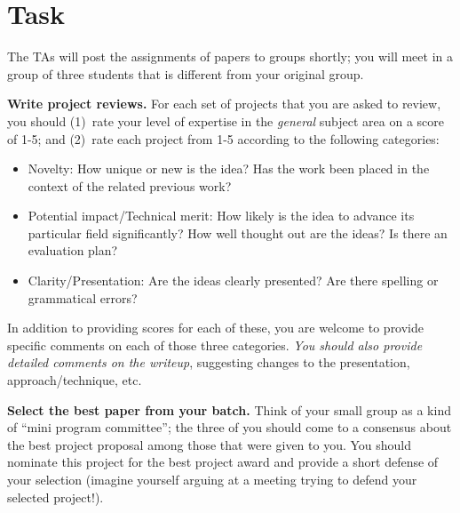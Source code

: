 \documentclass[11pt]{article}
\begin{document}
\section{Task}


The TAs will post the assignments of papers to groups shortly; you will
meet in a group of three students that is different from your original
group.  

{\bf Write project reviews.}
For each set of projects that you are asked to review, you
should (1)~rate your level of expertise in the {\em general} subject
area on a score of 1-5; and (2)~rate each project from 1-5 according to
the following categories:

\begin{itemize}
\itemsep=-1pt
\item Novelty: How unique or new is the idea?  Has the work been placed
  in the context of the related previous work?
\item Potential impact/Technical merit: How likely is the idea to
  advance its particular field significantly?  How well thought out are
  the ideas?  Is there an evaluation plan?
\item Clarity/Presentation: Are the ideas clearly presented?  Are there
  spelling or grammatical errors?
\end{itemize}

In addition to providing scores for each of these, you are welcome to
provide specific comments on each of those three categories.  {\em You
  should also provide detailed comments on the writeup}, suggesting
changes to the presentation, approach/technique, etc.

{\bf Select the best paper from your batch.}  
Think of your small group as a kind of ``mini program committee''; the
three of you should come to a consensus about the best project proposal
among those that were given to you.  You should nominate this project
for the best project award and provide a short defense of your selection
(imagine yourself arguing at a meeting trying to defend your selected
project!).
\end{document}
